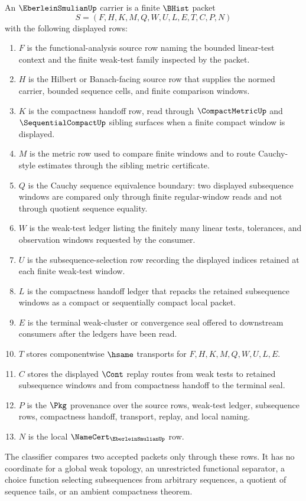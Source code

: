 \begin{definition}
\label{def:eberlein-smulian-finite-weak-window-carrier}
An $\EberleinSmulianUp$ carrier is a finite $\BHist$ packet
$$
S=(F,H,K,M,Q,W,U,L,E,T,C,P,N)
$$
with the following displayed rows:
\begin{enumerate}
\item $F$ is the functional-analysis source row naming the bounded linear-test context and the finite weak-test family inspected by the packet.
\item $H$ is the Hilbert or Banach-facing source row that supplies the normed carrier, bounded sequence cells, and finite comparison windows.
\item $K$ is the compactness handoff row, read through $\CompactMetricUp$ and $\SequentialCompactUp$ sibling surfaces when a finite compact window is displayed.
\item $M$ is the metric row used to compare finite windows and to route Cauchy-style estimates through the sibling metric certificate.
\item $Q$ is the Cauchy sequence equivalence boundary: two displayed subsequence windows are compared only through finite regular-window reads and not through quotient sequence equality.
\item $W$ is the weak-test ledger listing the finitely many linear tests, tolerances, and observation windows requested by the consumer.
\item $U$ is the subsequence-selection row recording the displayed indices retained at each finite weak-test window.
\item $L$ is the compactness handoff ledger that repacks the retained subsequence windows as a compact or sequentially compact local packet.
\item $E$ is the terminal weak-cluster or convergence seal offered to downstream consumers after the ledgers have been read.
\item $T$ stores componentwise $\hsame$ transports for $F,H,K,M,Q,W,U,L,E$.
\item $C$ stores the displayed $\Cont$ replay routes from weak tests to retained subsequence windows and from compactness handoff to the terminal seal.
\item $P$ is the $\Pkg$ provenance over the source rows, weak-test ledger, subsequence rows, compactness handoff, transport, replay, and local naming.
\item $N$ is the local $\NameCert_{\EberleinSmulianUp}$ row.
\end{enumerate}
The classifier compares two accepted packets only through these rows. It has no coordinate for a global weak topology, an unrestricted functional separator, a choice function selecting subsequences from arbitrary sequences, a quotient of sequence tails, or an ambient compactness theorem.
\end{definition}


